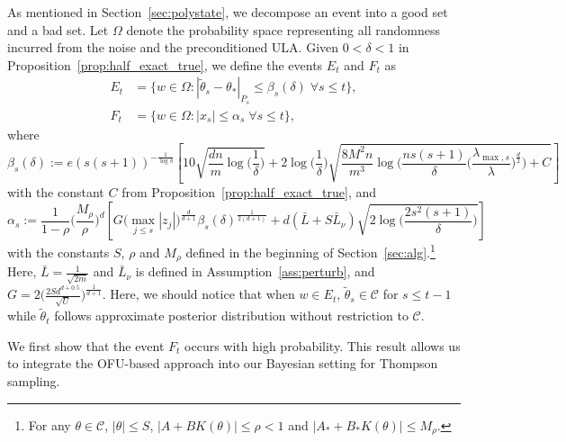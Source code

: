 \documentclass[11pt]{article}
\theoremstyle{plain}
\theoremstyle{definition}
\theoremstyle{remark}
\begin{document}
As mentioned in Section~\ref{sec:polystate},
we decompose an event into a good set and a bad set. 
Let  $\Omega$ denote the probability space representing all randomness incurred from the noise and the preconditioned ULA.
Given $0<\delta < 1$ in Proposition~\ref{prop:half_exact_true}, 
we define the events $E_t$ and $F_t$ as
\begin{align*}
E_t &= \{w \in \Omega: |\tilde\theta_s-\theta_*|_{P_s} \leq \beta_s(\delta)  \; \forall s \leq t\},\\
F_t &= \{w  \in \Omega:   |x_{s}| \leq \alpha_s  \; \forall s \leq t\}, 
\end{align*}
where 
\[ \beta_s(\delta) := e(s(s+1))^{-\frac{1}{\log \delta}}\left[10\sqrt{\frac{dn}{m} \log \bigg (\frac{1}{\delta}\bigg )}+ 2 \log \bigg (\frac{1}{\delta}\bigg ) \sqrt{\frac{8M^2n}{m^3}\log \bigg(\frac{n s (s+1)}{\delta}\bigg(\frac{\lambda_{\max,s}}{\lambda}\bigg)^{\frac{d}{2}}\bigg)+ C} \right ]\] 
with the constant $C$ from Proposition~\ref{prop:half_exact_true},
and 
\[\alpha_s := \frac{1}{1-\rho}\bigg(\frac{M_{\rho}}{\rho}\bigg)^d\left[{G}\Big (\max_{j\leq s}|z_j| \Big)^{\frac{d}{d+1}}\beta_s(\delta)^{\frac{1}{2(d+1)}}+ d(\bar L+S\bar L_{\nu})\sqrt{2\log\bigg(\frac{2s^2(s+1)}{\delta}\bigg)}\right]\]
with the constants $S$,
$\rho$ and $M_\rho$ defined in the beginning of Section~\ref{sec:alg}.\footnote{For any $\theta \in \mathcal{C}$, $|\theta| \leq S$, 
$|A + BK(\theta)| \leq \rho <1$ and $|A_* + B_* K(\theta) | \leq M_\rho$.}
Here, $\bar{L} = \frac{1}{\sqrt{2m}}$ and $\bar{L}_\nu$ is defined in Assumption~\ref{ass:perturb}, and $G=2\big(\frac{2Sd^{d+0.5}}{\sqrt{U}}\big)^{\frac{1}{d+1}}$. Here, we should notice that when $w \in E_t$, $\tilde \theta_s \in \mathcal {C}$ for $s\leq t-1$ while $\tilde \theta_t$ follows approximate posterior distribution without restriction to $\mathcal{C}$.



We first show that the event $F_t$ occurs with high probability. 
This result allows us to integrate the OFU-based approach into our Bayesian setting for Thompson sampling. 
\end{document}
